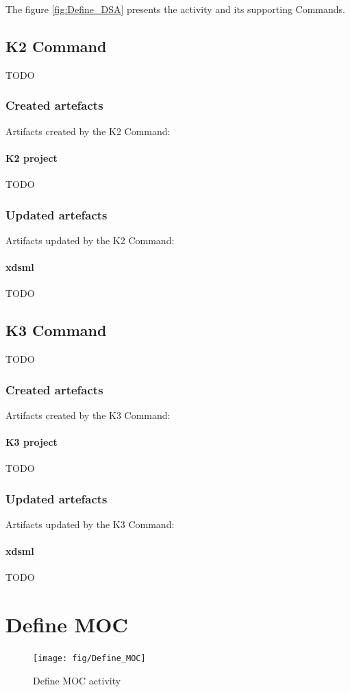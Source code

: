 \documentclass{gemoc} %
\begin{document}
The figure \ref{fig:Define_DSA} presents the activity and its supporting Commands.

\subsection{K2 Command}
TODO
\subsubsection{Created artefacts}
Artifacts created by the K2 Command:
\paragraph{K2 project} 
TODO
\subsubsection{Updated artefacts}
Artifacts updated by the K2 Command:
\paragraph{xdsml} 
TODO

\subsection{K3 Command}
TODO
\subsubsection{Created artefacts}
Artifacts created by the K3 Command:
\paragraph{K3 project} 
TODO
\subsubsection{Updated artefacts}
Artifacts updated by the K3 Command:
\paragraph{xdsml} 
TODO

\section{Define MOC}
\label{sec:Define_MOC}
\begin{figure}[h!]
		\center
		\texttt{[image: fig/Define\_MOC]}
		\caption{Define MOC activity}
		\label{fig:Define_MOC}
\end{figure}
\end{document}

